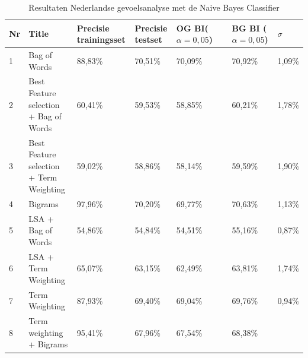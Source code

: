 \begin{table}
\centering
\caption{Resultaten Nederlandse gevoelsanalyse met de Naive Bayes Classifier}
\begin{adjustbox}{width=1\textwidth}
\begin{tabular}{|l|l|l|l|l|l|l|}
\hline
{\bf Nr} & {\bf Title}                                                                      & {\bf Precisie trainingsset} & {\bf Precisie testset} & {\bf OG BI($\alpha=0,05$)} & {\bf BG BI ($\alpha=0,05$)} & {\bf $\sigma$} \\ \hline
1        & Bag of Words                                                                     & 88,83\%                     & 70,51\%                & 70,09\%                 & 70,92\%                  & 1,09\%      \\ \hline
2        & Best Feature selection + Bag of Words                                            & 60,41\%                     & 59,53\%                & 58,85\%                 & 60,21\%                  & 1,78\%      \\ \hline
3        & Best Feature selection + Term Weighting                                          & 59,02\%                     & 58,86\%                & 58,14\%                 & 59,59\%                  & 1,90\%      \\ \hline
4        & Bigrams                                                                          & 97,96\%                     & 70,20\%                & 69,77\%                 & 70,63\%                  & 1,13\%      \\ \hline
5        & LSA + Bag of Words                                                               & 54,86\%                     & 54,84\%                & 54,51\%                 & 55,16\%                  & 0,87\%      \\ \hline
6        & LSA + Term Weighting                                                             & 65,07\%                     & 63,15\%                & 62,49\%                 & 63,81\%                  & 1,74\%      \\ \hline
7        & Term Weighting                                                                   & 87,93\%                     & 69,40\%                & 69,04\%                 & 69,76\%                  & 0,94\%      \\ \hline
8        & Term weighting  + Bigrams                                                        & 95,41\%                     & 67,96\%                & 67,54\%                 & 68,38\%                  &             \\ \hline

\end{tabular}
\end{adjustbox}
\end{table}
